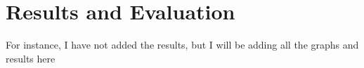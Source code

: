 \chapter{Results and Evaluation}
For instance, I have not added the results, but I will be adding all the graphs and results here